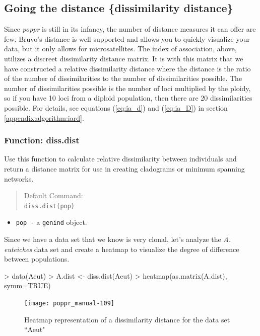 \documentclass[letterpaper]{article}
\newcommand{\tab}{\hspace*{1em}}
\begin{document}
\subsection{Going the distance \{dissimilarity distance\}}\label{index:dist}
\tab\tab Since \textit{poppr} is still in its infancy, the number of distance measures it can offer are few. Bruvo's distance is well supported and allows you to quickly visualize your data, but it only allows for microsatellites. The index of association, above, utilizes a discreet dissimilarity distance matrix. It is with this matrix that we have constructed a relative dissimilarity distance where the distance is the ratio of the number of dissimilarities to the number of dissimilarities possible. The number of dissimilarities possible is the number of loci multiplied by the ploidy, so if you have 10 loci from a diploid population, then there are 20 dissimilarities possible. For details, see equations (\ref{eq:ia_d}) and (\ref{eq:ia_D}) in section \ref{appendix:algorithm:iard}. 

\subsubsection{Function: diss.dist}\label{index:dist:diss.dist}

\tab\tab Use this function to calculate relative dissimilarity between individuals and return a distance matrix for use in creating cladograms or minimum spanning networks.

\begin{quote}
Default Command:\\
\texttt{diss.dist(pop)}
\end{quote}

\begin{itemize}
  \item \texttt{pop -} a \texttt{genind} object. 
\end{itemize}
Since we have a data set that we know is very clonal, let's analyze the \textit{A. euteiches} data set \cite{Grunwald:2006} and create a heatmap to visualize the degree of difference between populations.
\begin{Schunk}
\begin{Sinput}
> data(Aeut)
> A.dist <- diss.dist(Aeut)
> heatmap(as.matrix(A.dist), symm=TRUE)
\end{Sinput}
\end{Schunk}
\begin{figure}[h!]
  \centering
  \caption{\footnotesize Heatmap representation of a dissimilarity distance for the data set ``Aeut"}
  \label{diss_heat_map}
\texttt{[image: poppr\_manual-109]}
\end{figure}
\newpage
\end{document}
